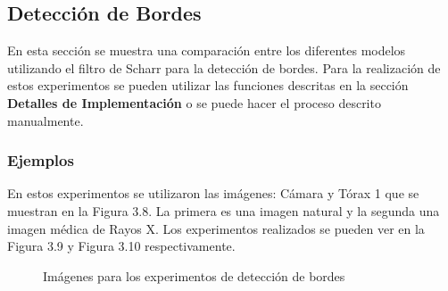 \subsection{Detecci\'on de Bordes}

En esta secci\'on se muestra una comparaci\'on entre los diferentes modelos utilizando el filtro de Scharr para la detecci\'on de bordes. Para la realizaci\'on de estos experimentos se pueden utilizar las funciones descritas en la secci\'on \textbf{Detalles de Implementaci\'on} o se puede hacer el proceso descrito manualmente. 

\subsubsection{Ejemplos}

En estos experimentos se utilizaron las im\'agenes: C\'amara y T\'orax 1 que se muestran en la Figura 3.8. La primera es una imagen natural y la segunda una imagen m\'edica de Rayos X. Los experimentos realizados se pueden ver en la Figura 3.9 y Figura 3.10 respectivamente.

\begin{figure}
	\begin{center}
		\caption{Im\'agenes para los experimentos de detecci\'on de bordes}
	\end{center}
\end{figure}

